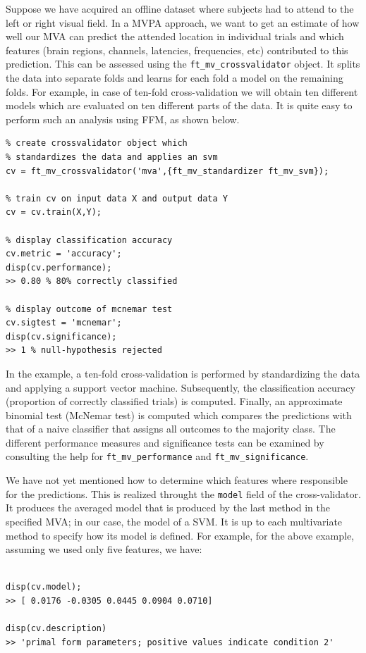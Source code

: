 \documentclass{article}
\renewcommand{\t}[1]{{\tt #1}}
\begin{document}
Suppose we have acquired an offline dataset where subjects had to attend to the left or right visual field. In a MVPA approach, we want to get an estimate of how well our MVA can predict the attended location in individual trials and which features (brain regions, channels, latencies, frequencies, etc) contributed to this prediction. This can be assessed using the \t{ft\_mv\_crossvalidator} object. It splits the data into separate folds and learns for each fold a model on the remaining folds. For example, in case of ten-fold cross-validation we will obtain ten different models which are evaluated on ten different parts of the data. It is quite easy to perform such an analysis using FFM, as shown below.
\begin{verbatim}
% create crossvalidator object which 
% standardizes the data and applies an svm
cv = ft_mv_crossvalidator('mva',{ft_mv_standardizer ft_mv_svm});

% train cv on input data X and output data Y
cv = cv.train(X,Y);

% display classification accuracy
cv.metric = 'accuracy';
disp(cv.performance);
>> 0.80 % 80% correctly classified

% display outcome of mcnemar test
cv.sigtest = 'mcnemar';
disp(cv.significance);
>> 1 % null-hypothesis rejected
\end{verbatim}
In the example, a ten-fold cross-validation is performed by standardizing the data and applying a support vector machine. Subsequently, the classification accuracy (proportion of correctly classified trials) is computed. Finally, an approximate binomial test (McNemar test) is computed which compares the predictions with that of a naive classifier that assigns all outcomes to the majority class. The different performance measures and significance tests can be examined by consulting the help for \t{ft\_mv\_performance} and \t{ft\_mv\_significance}.

We have not yet mentioned how to determine which features where responsible for the predictions. This is realized throught the \t{model} field of the cross-validator. It produces the averaged model that is produced by the last method in the specified MVA; in our case, the model of a SVM. It is up to each multivariate method to  specify how its model is defined. For example, for the above example, assuming we used only five features, we have:
\begin{verbatim}

disp(cv.model);
>> [ 0.0176 -0.0305 0.0445 0.0904 0.0710]

disp(cv.description)
>> 'primal form parameters; positive values indicate condition 2'

\end{verbatim}
\end{document}
